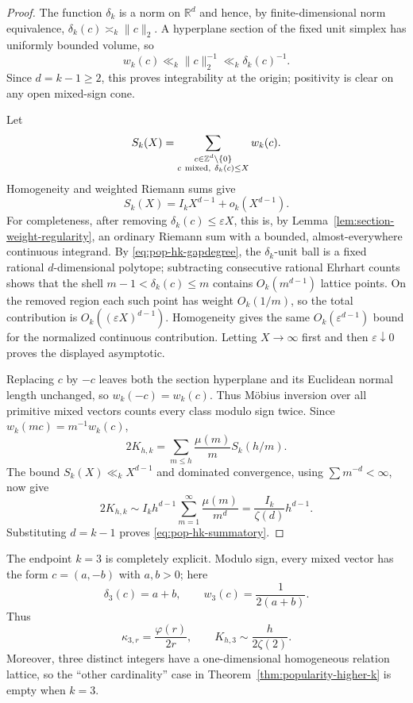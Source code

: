 \documentclass[11pt,reqno]{amsart}
\theoremstyle{definition}
\theoremstyle{remark}
\begin{document}
\begin{proof}
The function $\delta_k$ is a norm on $\mathbb R^d$ and hence, by
finite-dimensional norm equivalence,
$\delta_k(c)\asymp_k\|c\|_2$.  A hyperplane section of the fixed unit
simplex has uniformly bounded volume, so
\[
 w_k(c)\ll_k\|c\|_2^{-1}\ll_k\delta_k(c)^{-1}.
\]
Since $d=k-1\geq2$, this proves integrability at the origin; positivity is
clear on any open mixed-sign cone.

Let
\[
 S_k(X)=\sum_{\substack{c\in\mathbb Z^d\setminus\{0\}\\
                         c\ {\rm mixed},\ \delta_k(c)\leq X}}w_k(c).
\]
Homogeneity and weighted Riemann sums give
\[
 S_k(X)=I_kX^{d-1}+o_k(X^{d-1}).
\]
For completeness, after removing $\delta_k(c)\leq\varepsilon X$, this is,
by Lemma~\ref{lem:section-weight-regularity}, an ordinary Riemann sum with a
bounded, almost-everywhere continuous integrand.  By
\eqref{eq:pop-hk-gapdegree}, the $\delta_k$-unit ball is a fixed rational
$d$-dimensional polytope; subtracting consecutive rational Ehrhart counts
shows that the shell $m-1<\delta_k(c)\leq m$ contains
$O_k(m^{d-1})$ lattice points.  On the removed region each such point has
weight $O_k(1/m)$, so the total contribution is
$O_k((\varepsilon X)^{d-1})$.  Homogeneity gives the same
$O_k(\varepsilon^{d-1})$ bound for the normalized continuous contribution.
Letting $X\to\infty$ first and then $\varepsilon\downarrow0$ proves the
displayed asymptotic.

Replacing $c$ by $-c$ leaves both the section hyperplane and its Euclidean
normal length unchanged, so $w_k(-c)=w_k(c)$.  Thus M\"obius inversion over
all primitive mixed vectors counts every class modulo sign twice.  Since
$w_k(mc)=m^{-1}w_k(c)$,
\[
 2K_{h,k}=\sum_{m\leq h}\frac{\mu(m)}mS_k(h/m).
\]
The bound $S_k(X)\ll_kX^{d-1}$ and dominated convergence, using
$\sum m^{-d}<\infty$, now give
\[
 2K_{h,k}\sim
 I_kh^{d-1}\sum_{m=1}^{\infty}\frac{\mu(m)}{m^d}
 =\frac{I_k}{\zeta(d)}h^{d-1}.
\]
Substituting $d=k-1$ proves \eqref{eq:pop-hk-summatory}.
\end{proof}

The endpoint $k=3$ is completely explicit.  Modulo sign, every mixed
vector has the form $c=(a,-b)$ with $a,b>0$; here
\[
 \delta_3(c)=a+b,
 \qquad w_3(c)=\frac1{2(a+b)}.
\]
Thus
\begin{equation}\label{eq:pop-k3-explicit}
 \kappa_{3,r}=\frac{\varphi(r)}{2r},
 \qquad
 K_{h,3}\sim\frac{h}{2\zeta(2)}.
\end{equation}
Moreover, three distinct integers have a one-dimensional homogeneous
relation lattice, so the ``other cardinality'' case in
Theorem~\ref{thm:popularity-higher-k} is empty when $k=3$.
\end{document}
